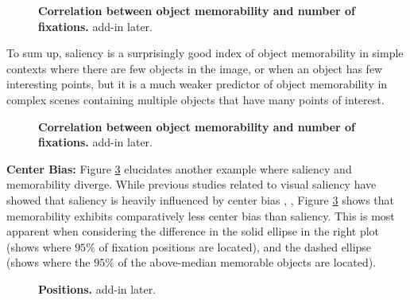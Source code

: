 \begin{figure}[t]
\centering
{}
\vspace{-5mm}\caption{\footnotesize\textbf{Correlation between object memorability and number of fixations.} add-in later. }\label{fig:fixCorr}
\end{figure}

To sum up, saliency is a surprisingly good index of object memorability in simple contexts where there are few objects in the image, or when an object has few interesting points, but it is a much weaker predictor of object memorability in complex scenes containing multiple objects that have many points of interest.

\begin{figure}[b]
\centering
{}
\vspace{-5mm}\caption{\footnotesize\textbf{Correlation between object memorability and number of fixations.} add-in later. }\label{fig:scatterFixation}
\end{figure}

\textbf{Center Bias: } Figure \ref{fig:fixPos} elucidates another example where saliency and memorability diverge. While previous studies related to visual saliency have showed that saliency is heavily influenced by center bias \cite{judd09}, \cite{sun08}, Figure \ref{fig:fixPos} shows that memorability exhibits comparatively less center bias than saliency. This is most apparent when considering the difference in the solid ellipse in the right plot (shows where $95\%$ of fixation positions are located), and the dashed ellipse (shows where the $95\%$ of the above-median memorable objects are located).

\begin{figure}[t]
\centering
{}
\vspace{-5mm}\caption{\footnotesize\textbf{Positions.} add-in later. }\label{fig:fixPos}
\end{figure}


